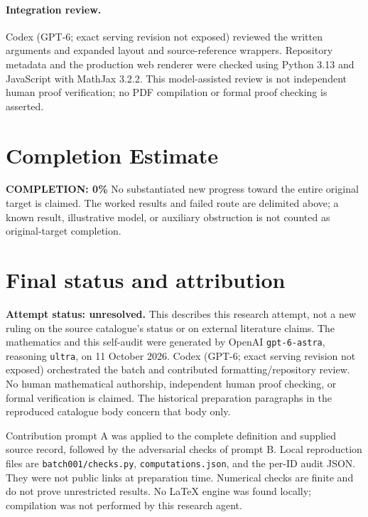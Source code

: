 \documentclass[11pt]{article}
\begin{document}
\paragraph{Integration review.} Codex (GPT-6; exact serving revision not exposed) reviewed the written arguments and expanded layout and source-reference wrappers. Repository metadata and the production web renderer were checked using Python 3.13 and JavaScript with MathJax 3.2.2. This model-assisted review is not independent human proof verification; no PDF compilation or formal proof checking is asserted.

\section{Completion Estimate}
\noindent\textbf{COMPLETION: 0\%}
No substantiated new progress toward the entire original target is claimed. The worked results and failed route are delimited above; a known result, illustrative model, or auxiliary obstruction is not counted as original-target completion.

\section{Final status and attribution}
\textbf{Attempt status: unresolved.} This describes this research attempt, not a new ruling on the source catalogue's status or on external literature claims.
The mathematics and this self-audit were generated by OpenAI \texttt{gpt-6-astra}, reasoning \texttt{ultra}, on 11 October 2026. Codex (GPT-6; exact serving revision not exposed) orchestrated the batch and contributed formatting/repository review. No human mathematical authorship, independent human proof checking, or formal verification is claimed. The historical preparation paragraphs in the reproduced catalogue body concern that body only.

Contribution prompt A was applied to the complete definition and supplied source record, followed by the adversarial checks of prompt B. Local reproduction files are \texttt{batch001/checks.py}, \texttt{computations.json}, and the per-ID audit JSON. They were not public links at preparation time. Numerical checks are finite and do not prove unrestricted results. No LaTeX engine was found locally; compilation was not performed by this research agent.
\end{document}
